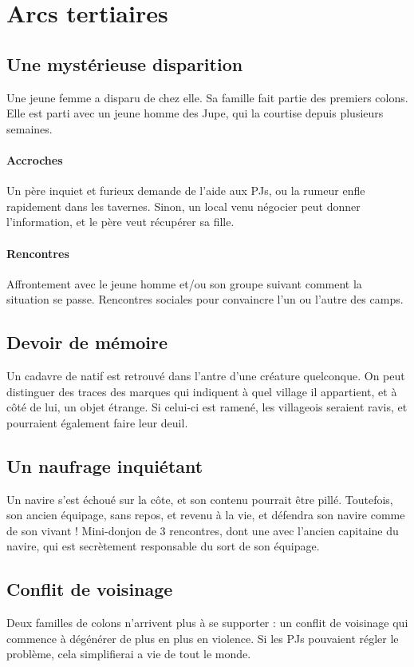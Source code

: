 \documentclass[10pt,a4paper]{book}
\begin{document}
\section{Arcs tertiaires}
\subsection{Une mystérieuse disparition}
Une jeune femme a disparu de chez elle. Sa famille fait partie des premiers colons. Elle est parti avec un jeune homme des Jupe, qui la courtise depuis plusieurs semaines.
\paragraph{Accroches} Un père inquiet et furieux demande de l'aide aux PJs, ou la rumeur enfle rapidement dans les tavernes. Sinon, un local venu négocier peut donner l'information, et le père veut récupérer sa fille.
\paragraph{Rencontres} Affrontement avec le jeune homme et/ou son groupe suivant comment la situation se passe. Rencontres sociales pour convaincre l'un ou l'autre des camps.
\subsection{Devoir de mémoire}
Un cadavre de natif est retrouvé dans l'antre d'une créature quelconque. On peut distinguer des traces des marques qui indiquent à quel village il appartient, et à côté de lui, un objet étrange.
Si celui-ci est ramené, les villageois seraient ravis, et pourraient également faire leur deuil.
\subsection{Un naufrage inquiétant}

Un navire s'est échoué sur la côte, et son contenu pourrait être pillé. Toutefois, son ancien équipage, sans repos, et revenu à la vie, et défendra son navire comme de son vivant !
Mini-donjon de 3 rencontres, dont une avec l'ancien capitaine du navire, qui est secrètement responsable du sort de son équipage.
\subsection{Conflit de voisinage}
Deux familles de colons n'arrivent plus à se supporter : un conflit de voisinage qui commence à dégénérer de plus en plus en violence. Si les PJs pouvaient régler le problème, cela simplifierai a vie de tout le monde.
\end{document}
